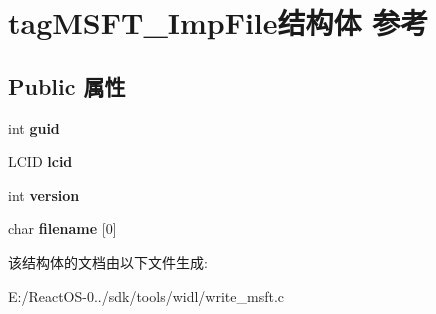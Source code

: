 \hypertarget{structtag_m_s_f_t___imp_file}{}\section{tag\+M\+S\+F\+T\+\_\+\+Imp\+File结构体 参考}
\label{structtag_m_s_f_t___imp_file}
\subsection*{Public 属性}
\begin{DoxyCompactItemize}
\item 
\mbox{\label{structtag_m_s_f_t___imp_file_ae3383c08fb8d324ef61ce5ff1ada0d26}} 
int {\bfseries guid}
\item 
\mbox{\label{structtag_m_s_f_t___imp_file_a5adf41571107a018dbce75911dd30dd8}} 
L\+C\+ID {\bfseries lcid}
\item 
\mbox{\label{structtag_m_s_f_t___imp_file_a7e7f8c5e2927fa6d97cc7f6b9aaa3acf}} 
int {\bfseries version}
\item 
\mbox{\label{structtag_m_s_f_t___imp_file_a725c2f346923b646a4a246604d73d2ca}} 
char {\bfseries filename} \mbox{[}0\mbox{]}
\end{DoxyCompactItemize}


该结构体的文档由以下文件生成\+:\begin{DoxyCompactItemize}
\item 
E\+:/\+React\+O\+S-\/0../sdk/tools/widl/write\+\_\+msft.\+c\end{DoxyCompactItemize}
